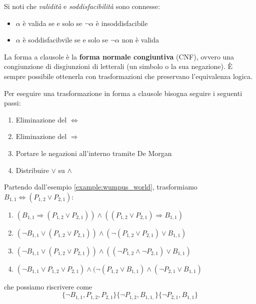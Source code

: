 Si noti che \textit{validità} e \textit{soddisfacibilità} sono connesse:
\begin{itemize}
	\item $\alpha$ è valida se e solo se $\neg\alpha$ è insoddisfacibile
	\item $\alpha$ è soddisfacibvile se e solo se $\neg\alpha$ non è valida
\end{itemize}
\begin{definition}
	La forma a clausole è la \textbf{forma normale congiuntiva} (CNF), ovvero una congiunzione di disgiunzioni di letterali (un simbolo o la sua negazione). È sempre possibile ottenerla con trasformazioni che preservano l'equivalenza logica.
\end{definition}
Per eseguire una trasformazione in forma a clausole bisogna seguire i seguenti passi:
\begin{enumerate}
	\item Eliminazione del $\Leftrightarrow$
	\item Eliminazione del $\Rightarrow$
	\item Portare le negazioni all'interno tramite De Morgan
	\item Distribuire $\lor$ su $\land$
\end{enumerate}

\begin{example}
	Partendo dall'esempio \ref{example:wumpus_world}, trasformiamo $B_{1,1} \Leftrightarrow (P_{1,2}\lor P_{2,1})$:
	\begin{enumerate}
		\item $(B_{1,1} \Rightarrow (P_{1,2} \lor P_{2,1})) \land ((P_{1,2} \lor P_{2,1}) \Rightarrow B_{1,1})$
		\item $(\neg B_{1,1} \lor (P_{1,2} \lor P_{2,1})) \land (\neg(P_{1,2} \lor P_{2,1}) \lor B_{1,1})$
		\item $(\neg B_{1,1} \lor (P_{1,2} \lor P_{2,1})) \land ((\neg P_{1,2} \land \neg P_{2,1}) \lor B_{1,1})$
		\item $(\neg B_{1,1} \lor P_{1,2} \lor P_{2,1}) \land (\neg(P_{1,2} \lor B_{1,1}) \land (\neg P_{2,1} \lor B_{1,1})$
	\end{enumerate}
	che possiamo riscrivere come
	\begin{equation*}
		\{\neg B_{1,1}, P_{1,2}, P_{2,1}\}\{\neg P_{1,2}, B_{1,1,}\}\{\neg P_{2,1}, B_{1,1}\}
	\end{equation*}
\end{example}

